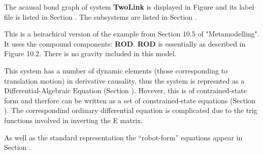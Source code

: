 
%

   The acausal bond graph of system \textbf{TwoLink} is
   displayed in Figure  and its label
   file is listed in Section .
   The subsystems are listed in Section .

This is a heirachical version of the example from Section 10.5 of
"Metamodelling".  It uses the compound components: {\bf ROD}.  {\bf
ROD} is essentially as described in Figure 10.2.
There is no gravity included in this model.

This system has a number of dynamic elements (those corresponding to translation
motion) in derivative causality, thus the system is represnted as a
Differential-Algebraic Equation (Section
). Hovever, this is of contrained-state form and
therfore can be written as a set of constrained-state equations (Section
). The correspondind ordinary differential
equation is complicated due to the trig functions involved in
inverting the E matrix.

As well as the standard representation the ``robot-form'' equations
appear in Section  . 

